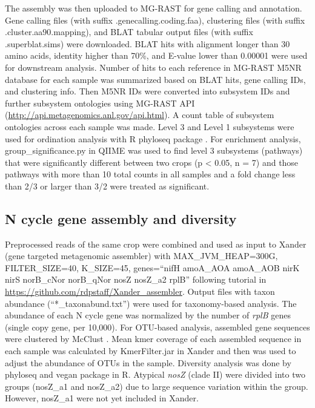 \documentclass[]{msu-thesis}
\begin{document}
The assembly was then uploaded to MG-RAST \cite{meyer_metagenomics_2008}
for gene calling and annotation. Gene calling files (with suffix
.genecalling.coding.faa), clustering files (with suffix
.cluster.aa90.mapping), and BLAT \cite{kent_blatblast-like_2002} tabular
output files (with suffix .superblat.sims) were downloaded. BLAT hits
with alignment longer than 30 amino acids, identity higher than 70\%,
and E-value lower than 0.00001 were used for downstream analysis. Number
of hits to each reference in MG-RAST M5NR database for each sample was
summarized based on BLAT hits, gene calling IDs, and clustering info.
Then M5NR IDs were converted into subsystem IDs and further subsystem
ontologies using MG-RAST API
(\url{http://api.metagenomics.anl.gov/api.html}). A count
table of subsystem ontologies across each sample was made. Level 3 and
Level 1 subsystems were used for ordination analysis with R phyloseq
package \cite{mcmurdie_phyloseq:_2013}. For enrichment analysis,
group\_significance.py in QIIME \cite{kuczynski_using_2012} was used to
find level 3 subsystems (pathways) that were significantly different between
two crops (p < 0.05, n = 7) and those pathways with more than 10 total
counts in all samples and a fold change less than 2/3 or larger than 3/2
were treated as significant.

\begin{sloppypar}
\subsection{N cycle gene assembly and diversity} 
Preprocessed reads of the same crop were combined and used as input to
Xander (gene targeted metagenomic assembler) \cite{wang_xander:_2015}
with MAX\_JVM\_HEAP=300G, FILTER\_SIZE=40, K\_SIZE=45, genes=``nifH
amoA\_AOA amoA\_AOB nirK nirS norB\_cNor norB\_qNor nosZ nosZ\_a2 rplB''
following tutorial in
\url{https://github.com/rdpstaff/Xander\_assembler}. Output files with
taxon abundance (``*\_taxonabund.txt'') were used for taxonomy-based
analysis. The abundance of each N cycle gene was normalized by the
number of \textit{rplB} genes (single copy gene, per 10,000). For
OTU-based analysis, assembled gene sequences were clustered by McClust
\cite{cole_ribosomal_2014}. Mean kmer coverage of each assembled
sequence in each sample was calculated by KmerFilter.jar in Xander and
then was used to adjust the abundance of OTUs in the sample.  Diversity
analysis was done by phyloseq and vegan package in R. Atypical
\textit{nosZ} (clade II) were divided into two groups (nosZ\_a1 and
nosZ\_a2) due to large sequence variation within the group. However,
nosZ\_a1 were not yet included in Xander.
\end{sloppypar}
\end{document}
